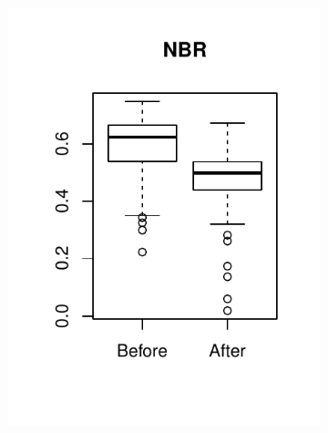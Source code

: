 \documentclass[a4paper,12pt]{scrbook}
\begin{document}
\begin{figure}
\begin{subfigure}[b]{0.32\textwidth}
    \includegraphics[width=\textwidth]{thesis-figures/05-boxplot-nbr}
  \end{subfigure}
  \begin{subfigure}[b]{0.32\textwidth}

\end{subfigure}
\end{figure}
\end{document}
